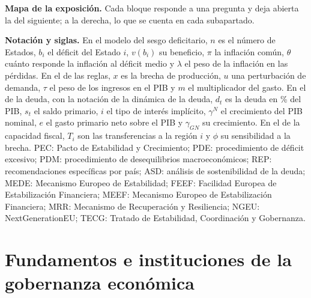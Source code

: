 \documentclass[11pt]{article}
\begin{document}
\begin{anotaciones}
\textbf{Mapa de la exposición.} Cada bloque responde a una pregunta y deja abierta la del siguiente; a la derecha, lo que se cuenta en cada subapartado.
\begin{infografiacaja}
\caption{Mapa del tema: la pregunta de cada bloque y el hilo que los une}\label{figu:mapa-tema}
\end{infografiacaja}
\end{anotaciones}


\begin{anotaciones}
\textbf{Notación y siglas.} En el modelo del sesgo deficitario, $n$ es el número de Estados, $b_i$ el déficit del Estado $i$, $v(b_i)$ su beneficio, $\pi$ la inflación común, $\theta$ cuánto responde la inflación al déficit medio y $\lambda$ el peso de la inflación en las pérdidas. En el de las reglas, $x$ es la brecha de producción, $u$ una perturbación de demanda, $\tau$ el peso de los ingresos en el PIB y $m$ el multiplicador del gasto. En el de la deuda, con la notación de la dinámica de la deuda, $d_t$ es la deuda en \% del PIB, $s_t$ el saldo primario, $i$ el tipo de interés implícito, $\gamma^N$ el crecimiento del PIB nominal, $e$ el gasto primario neto sobre el PIB y $\gamma_{GN}$ su crecimiento. En el de la capacidad fiscal, $T_i$ son las transferencias a la región $i$ y $\phi$ su sensibilidad a la brecha. PEC: Pacto de Estabilidad y Crecimiento; PDE: procedimiento de déficit excesivo; PDM: procedimiento de desequilibrios macroeconómicos; REP: recomendaciones específicas por país; ASD: análisis de sostenibilidad de la deuda; MEDE: Mecanismo Europeo de Estabilidad; FEEF: Facilidad Europea de Estabilización Financiera; MEEF: Mecanismo Europeo de Estabilización Financiera; MRR: Mecanismo de Recuperación y Resiliencia; NGEU: NextGenerationEU; TECG: Tratado de Estabilidad, Coordinación y Gobernanza.
\end{anotaciones}

\section{Fundamentos e instituciones de la gobernanza económica}\label{sec:fundamentos}
\end{document}
